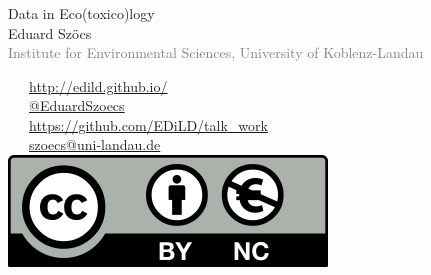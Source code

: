 \documentclass[12pt, t]{beamer}
\begin{document}
\begin{frame}
\frametitle{}
\vspace{1em}
\begin{centering}
\Large \textcolor{title}{Data in Eco(toxico)logy} \\[1em]
Eduard Szöcs \\[0.3em]
\tiny \textcolor{gray}{Institute for Environmental Sciences, University of Koblenz-Landau} \\[5em]
\end{centering}
\normalsize
\textcolor{hilight}{\faLaptop}~~~\href{http://edild.github.io/}{http://edild.github.io/ }\\[.5em]
\textcolor{hilight}{\faTwitter}~~~\href{http://twitter.com/EduardSzoecs}{@EduardSzoecs} 	\\[0.5em]
\textcolor{hilight}{\faGift}~~~\href{https://github.com/EDiLD/talk_work}{https://github.com/EDiLD/talk\_work}\\[0.5em]
\textcolor{hilight}{\faEnvelope}~~~\href{mailto:szoecs@uni-landau.de}{szoecs@uni-landau.de} \\[.5em]
\hfill \includegraphics[width =.3\textwidth]{fig/Cc-by-nc_euro_icon.png} 
\end{frame}
\end{document}

